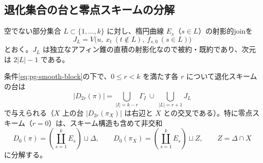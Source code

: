 \subsection{退化集合の台と零点スキームの分解}
空でない部分集合 $L\subset\{1,\ldots,k\}$ に対し、楕円曲線 $E_s$（$s\in L$）の射影的joinを
\begin{equation}
J_L=V\bigl(u,\ x_t\ (t\notin L),\ f_{s,0}\ (s\in L)\bigr)
\end{equation}
とおく。$J_L$ は独立なアフィン錐の直積の射影化なので被約・既約であり、次元は $2|L|-1$ である。

\begin{proposition}\label{prop:pg-deg-support}
条件\eqref{eq:pg-smooth-block}の下で、$0\leq r<k$ を満たす各 $r$ について退化スキームの台は
\begin{equation}
|D_{2r}(\pi)|=\bigcup_{|I|=k-r}\Gamma_I\ \cup\ \bigcup_{|L|=r+1}J_L
\end{equation}
で与えられる（$X$ 上の台 $|D_{2r}(\pi_X)|$ は右辺と $X$ との交叉である）。特に零点スキーム（$r=0$）は、スキーム構造も含めて非交和
\begin{equation}
D_0(\pi)=\left(\coprod_{s=1}^k E_s\right)\sqcup\Delta,
\qquad D_0(\pi_X)=\left(\coprod_{s=1}^k E_s\right)\sqcup Z,
\qquad Z=\Delta\cap X
\end{equation}
に分解する。
\end{proposition}

